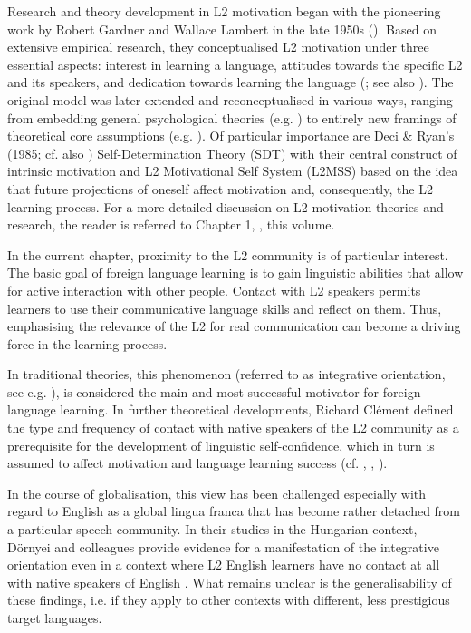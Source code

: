 \documentclass[output=paper]{langsci/langscibook}
\begin{document}
Research and theory development in L2 motivation began with the pioneering work by Robert Gardner and Wallace Lambert in the late 1950s (\citealt{GardnerLambert1959}). Based on extensive empirical research, they conceptualised L2 motivation under three essential aspects: interest in learning a language, attitudes towards the specific L2 and its speakers, and dedication towards learning the language (\citealt{GardnerLambert1959}; see also \citealt{Gardner1985}). The original model was later extended and reconceptualised in various ways, ranging from embedding general psychological theories (e.g. \citealt{Noels2001}) to entirely new framings of theoretical core assumptions (e.g. \citealt{Doernyei2005}). Of particular importance are Deci \& Ryan’s (1985; cf. also \citealt{RyanDeci2002}) Self-Determination Theory (SDT) with their central construct of intrinsic motivation and  L2 Motivational Self System (L2MSS) based on the idea that future projections of oneself affect motivation and, consequently, the L2 learning process. For a more detailed discussion on L2 motivation theories and research, the reader is referred to Chapter 1, , this volume.

In the current chapter, proximity to the L2 community is of particular interest. The basic goal of foreign language learning is to gain linguistic abilities that allow for active interaction with other people. Contact with L2 speakers permits learners to use their communicative language skills and reflect on them. Thus, emphasising the relevance of the L2 for real communication can become a driving force in the learning process.

In traditional theories, this phenomenon (referred to as integrative orientation, see e.g. \citealt{Gardner1985}), is considered the main and most successful motivator for foreign language learning. In further theoretical developments, Richard Clément defined the type and frequency of contact with native speakers of the L2 community as a prerequisite for the development of linguistic self-confidence, which in turn is assumed to affect motivation and language learning success (cf. \citealt{Clement1980}, \citealt{ClementKruidenier1985}, \citealt{SampasivamClement2014}). 

In the course of globalisation, this view has been challenged especially with regard to English as a global lingua franca that has become rather detached from a particular speech community. In their studies in the Hungarian context, Dörnyei and colleagues provide evidence for a manifestation of the integrative orientation even in a context where L2 English learners have no contact at all with native speakers of English \citep{DoernyeiEtAl2006}. What remains unclear is the generalisability of these findings, i.e. if they apply to other contexts with different, less prestigious target languages.
\end{document}
